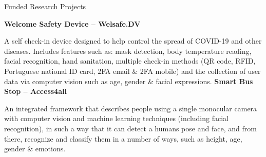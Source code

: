 \begin{rubric}{Funded Research Projects}

  \entry*[\texttt{2020 –- 2021~~~~}]
  \textbf{Welcome Safety Device – Welsafe.DV}

  \par A self check-in device designed to help control the
  spread of COVID-19 and other diseases. Includes features such as: mask detection, body
  temperature reading, facial recognition, hand sanitation, multiple check-in methods (QR code,
  RFID, Portuguese national ID card, 2FA email \& 2FA mobile) and the collection of user data via
  computer vision such as age, gender \& facial expressions.
  \vspace{0.25cm}
  \entry*[\texttt{2018 –- 2019~~~~}]
  \textbf{Smart Bus Stop – Access4all}

  \par An integrated framework that describes people using a single
  monocular camera with computer vision and machine learning techniques (including facial
  recognition), in such a way that it can detect a human\textquotesingle s pose and face, and from there, recognize
  and classify them in a number of ways, such as height, age, gender \& emotions.

\end{rubric}